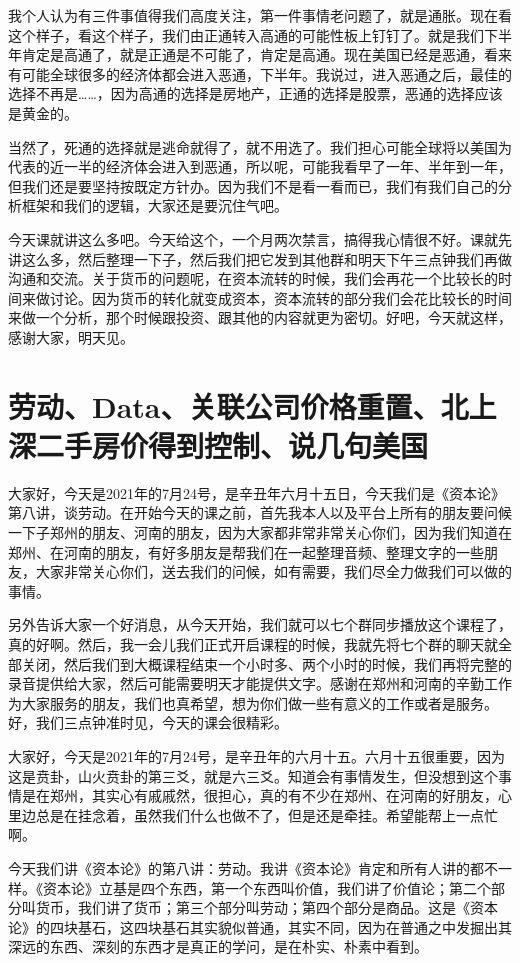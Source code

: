 \documentclass[UTF8, 12pt, a4paper]{ctexrep}
\begin{document}
我个人认为有三件事值得我们高度关注，第一件事情老问题了，就是通胀。现在看这个样子，看这个样子，我们由正通转入高通的可能性板上钉钉了。就是我们下半年肯定是高通了，就是正通是不可能了，肯定是高通。现在美国已经是恶通，看来有可能全球很多的经济体都会进入恶通，下半年。我说过，进入恶通之后，最佳的选择不再是……，因为高通的选择是房地产，正通的选择是股票，恶通的选择应该是黄金的。

当然了，死通的选择就是逃命就得了，就不用选了。我们担心可能全球将以美国为代表的近一半的经济体会进入到恶通，所以呢，可能我看早了一年、半年到一年，但我们还是要坚持按既定方针办。因为我们不是看一看而已，我们有我们自己的分析框架和我们的逻辑，大家还是要沉住气吧。

今天课就讲这么多吧。今天给这个，一个月两次禁言，搞得我心情很不好。课就先讲这么多，然后整理一下子，然后我们把它发到其他群和明天下午三点钟我们再做沟通和交流。关于货币的问题呢，在资本流转的时候，我们会再花一个比较长的时间来做讨论。因为货币的转化就变成资本，资本流转的部分我们会花比较长的时间来做一个分析，那个时候跟投资、跟其他的内容就更为密切。好吧，今天就这样，感谢大家，明天见。

\section{劳动、Data、关联公司价格重置、北上深二手房价得到控制、说几句美国}

大家好，今天是2021年的7月24号，是辛丑年六月十五日，今天我们是《资本论》第八讲，谈劳动。在开始今天的课之前，首先我本人以及平台上所有的朋友要问候一下子郑州的朋友、河南的朋友，因为大家都非常非常关心你们，因为我们知道在郑州、在河南的朋友，有好多朋友是帮我们在一起整理音频、整理文字的一些朋友，大家非常关心你们，送去我们的问候，如有需要，我们尽全力做我们可以做的事情。

另外告诉大家一个好消息，从今天开始，我们就可以七个群同步播放这个课程了，真的好啊。然后，我一会儿我们正式开启课程的时候，我就先将七个群的聊天就全部关闭，然后我们到大概课程结束一个小时多、两个小时的时候，我们再将完整的录音提供给大家，然后可能需要明天才能提供文字。感谢在郑州和河南的辛勤工作为大家服务的朋友，我们也真希望，想为你们做一些有意义的工作或者是服务。好，我们三点钟准时见，今天的课会很精彩。

大家好，今天是2021年的7月24号，是辛丑年的六月十五。六月十五很重要，因为这是贲卦，山火贲卦的第三爻，就是六三爻。知道会有事情发生，但没想到这个事情是在郑州，其实心有戚戚然，很担心，真的有不少在郑州、在河南的好朋友，心里边总是在挂念着，虽然我们什么也做不了，但是还是牵挂。希望能帮上一点忙啊。

今天我们讲《资本论》的第八讲：劳动。我讲《资本论》肯定和所有人讲的都不一样。《资本论》立基是四个东西，第一个东西叫价值，我们讲了价值论；第二个部分叫货币，我们讲了货币；第三个部分叫劳动；第四个部分是商品。这是《资本论》的四块基石，这四块基石其实貌似普通，其实不同，因为在普通之中发掘出其深远的东西、深刻的东西才是真正的学问，是在朴实、朴素中看到。
\end{document}

